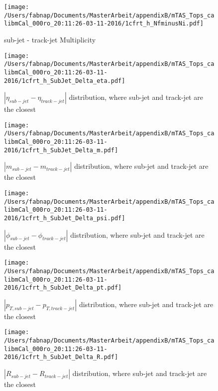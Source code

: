 \begin{figure}
 
\texttt{[image: /Users/fabnap/Documents/MasterArbeit/appendixB/mTAS\_Tops\_calibmCal\_000ro\_20:11:26-03-11-2016/1cfrt\_h\_NfminusNi.pdf]}
\caption{sub-jet - track-jet Multiplicity}
 
\end{figure}

\clearpage %

\begin{figure}
 
\texttt{[image: /Users/fabnap/Documents/MasterArbeit/appendixB/mTAS\_Tops\_calibmCal\_000ro\_20:11:26-03-11-2016/1cfrt\_h\_SubJet\_Delta\_eta.pdf]}
\caption{$| \eta_{sub-jet} - \eta_{track-jet} | $ distribution, where sub-jet and track-jet are the closest}
 
\end{figure}
 
\begin{figure}
 
\texttt{[image: /Users/fabnap/Documents/MasterArbeit/appendixB/mTAS\_Tops\_calibmCal\_000ro\_20:11:26-03-11-2016/1cfrt\_h\_SubJet\_Delta\_m.pdf]}
\caption{$| m_{sub-jet} - m_{track-jet} |$ distribution, where sub-jet and track-jet are the closest}
 
\end{figure}
 
\begin{figure}
 
\texttt{[image: /Users/fabnap/Documents/MasterArbeit/appendixB/mTAS\_Tops\_calibmCal\_000ro\_20:11:26-03-11-2016/1cfrt\_h\_SubJet\_Delta\_psi.pdf]}
\caption{$| \phi_{sub-jet} - \phi_{track-jet} | $ distribution, where sub-jet and track-jet are the closest}
 
\end{figure}
\begin{figure}
 
\texttt{[image: /Users/fabnap/Documents/MasterArbeit/appendixB/mTAS\_Tops\_calibmCal\_000ro\_20:11:26-03-11-2016/1cfrt\_h\_SubJet\_Delta\_pt.pdf]}
\caption{$| p_{T,sub-jet} - p_{T,track-jet} | $ distribution, where sub-jet and track-jet are the closest}
 
\end{figure}
 
\begin{figure}
 
\texttt{[image: /Users/fabnap/Documents/MasterArbeit/appendixB/mTAS\_Tops\_calibmCal\_000ro\_20:11:26-03-11-2016/1cfrt\_h\_SubJet\_Delta\_R.pdf]}
\caption{$| R_{sub-jet} - R_{track-jet} | $ distribution, where sub-jet and track-jet are the closest}
 
\end{figure}
 
